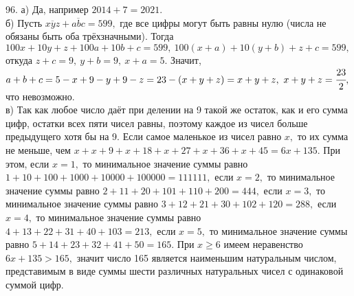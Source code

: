 96. а) Да, например $2014+7=2021.$\\
б) Пусть $\overline{xyz}+\overline{abc}=599,$ где все цифры могут быть равны нулю (числа не обязаны быть оба трёхзначными). Тогда $100x+10y+z+100a+10b+c=599,\
100(x+a)+10(y+b)+z+c=599,$ откуда $z+c=9,\ y+b=9,\ x+a=5.$ Значит, $a+b+c=5-x+9-y+9-z=23-(x+y+z)=x+y+z,\ x+y+z=\cfrac{23}{2},$ что невозможно.\\
в) Так как любое число даёт при делении на 9 такой же остаток, как и его сумма цифр, остатки всех пяти чисел равны, поэтому каждое из чисел больше предыдущего хотя бы на 9. Если самое маленькое из чисел равно $x,$ то их сумма не меньше, чем $x+x+9+x+18+x+27+x+36+x+45=6x+135.$ При этом, если $x=1,$ то минимальное значение суммы равно $1+10+100+1000+10000+100000=111111,$ если $x=2,$ то минимальное значение суммы равно $2+11+20+101+110+200=444,$ если $x=3,$ то минимальное значение суммы равно $3+12+21+30+102+120=288,$ если $x=4,$ то минимальное значение суммы равно $4+13+22+31+40+103=213,$ если $x=5,$ то минимальное значение суммы равно
$5+14+23+32+41+50=165.$ При $x\geqslant6$ имеем неравенство $6x+135>165,$ значит число 165 является наименьшим натуральным числом, представимым в виде суммы шести различных натуральных чисел с одинаковой суммой цифр.\\
